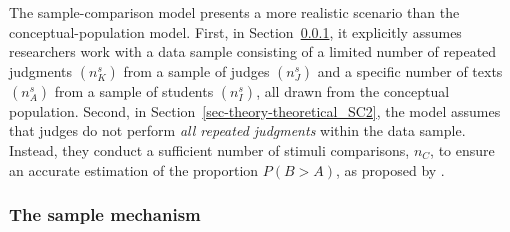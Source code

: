 \documentclass[
  authoryear,
  review,
  1p]{elsarticle}
\begin{document}
The sample-comparison model presents a more realistic scenario than the
conceptual-population model. First, in
Section~\ref{sec-theory-theoretical_SC1}, it explicitly assumes
researchers work with a data sample consisting of a limited number of
repeated judgments \((n^{s}_{K})\) from a sample of judges
\((n^{s}_{J})\) and a specific number of texts \((n^{s}_{A})\) from a
sample of students \((n^{s}_{I})\), all drawn from the conceptual
population. Second, in Section~\ref{sec-theory-theoretical_SC2}, the
model assumes that judges do not perform \emph{all repeated judgments}
within the data sample. Instead, they conduct a sufficient number of
stimuli comparisons, \(n_{C}\), to ensure an accurate estimation of the
proportion \(P(B>A)\), as proposed by \citet{Thurstone_1927b}.

\subsubsection{The sample mechanism}\label{sec-theory-theoretical_SC1}
\end{document}
